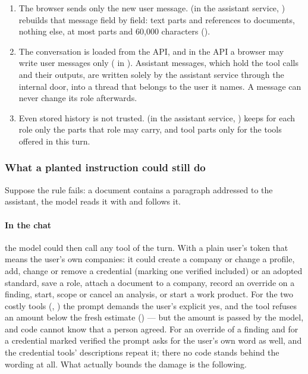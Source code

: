 \begin{enumerate}
  \item The browser sends only the new user message.  (in the assistant
    service, ) rebuilds that message field by field: text parts and
    references to documents, nothing else, at most  \code{=}  parts and
    60,000 characters ().
  \item The conversation is loaded from the API, and in the API a browser may write user
    messages only ( \code{=}  in ).
    Assistant messages, which hold the tool calls and their outputs, are written solely by
    the assistant service through the internal door, into a thread that belongs to the user
    it names. A message can never change its role afterwards.
  \item Even stored history is not trusted.  (in the assistant
    service, ) keeps for each role only the parts that role may carry,
    and tool parts only for the tools offered in this turn.
\end{enumerate}

\subsubsection{What a planted instruction could still do}

Suppose the rule fails: a document contains a paragraph addressed to the assistant, the
model reads it with  and follows it.

\paragraph{In the chat} the model could then call any tool of the turn. With a plain user's
token that means the user's own companies: it could create a company or change a profile,
add, change or remove a credential (marking one verified included) or an adopted standard,
save a role, attach a document to
a company, record an override on a finding, start, scope or cancel an analysis, or start a
work product. For the two
costly tools (, ) the prompt demands
the user's explicit yes, and the tool refuses an amount below the fresh estimate () --- but the amount is passed by the model, and
code cannot know that a person agreed. For an override of a finding and for a credential
marked verified the prompt asks for the user's own word as well, and the credential tools'
descriptions repeat it; there no code stands behind the wording at all. What actually bounds
the damage is the following.

